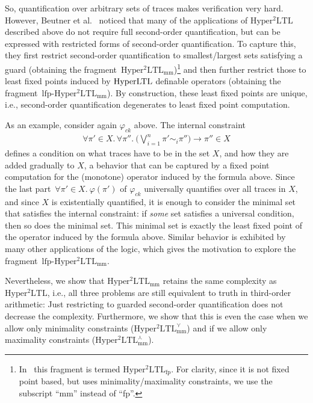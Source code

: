 \documentclass[dvipsnames,10pt,a4paper]{amsart}
\theoremstyle{definition}
\theoremstyle{remark}
\renewcommand{\phi}{\varphi}
\newcommand{\hyltl}{\mathrm{Hyper\-LTL}\xspace}
\newcommand{\sohyltl}{\mathrm{Hyper^2LTL}\xspace}
\newcommand{\sohyltlfp}{\mathrm{Hyper^2LTL_{\mathrm{mm}}}\xspace}
\newcommand{\sohyltlfpmax}{\mathrm{Hyper^2LTL_{\mathrm{mm}}^{\largest}}\xspace}
\newcommand{\sohyltlfpmin}{\mathrm{Hyper^2LTL_{\mathrm{mm}}^{\smallest}}\xspace}
\newcommand{\lfpsohyltlfp}{\mathrm{lfp\text{-}{Hyper^2LTL_{\mathrm{mm}}}}\xspace}
\newcommand{\sohyltlfpold}{\mathrm{Hyper^2LTL_{\mathrm{fp}}}\xspace}
\newcommand{\smallest}{\curlyvee}
\newcommand{\largest}{\curlywedge}
\newcommand{\myquot}[1]{``#1''}
\newcommand{\ck}{\mathit{ck}}
\begin{document}
So, quantification over arbitrary sets of traces makes verification very hard. 
However, Beutner et al.~\cite{DBLP:conf/cav/BeutnerFFM23} noticed that many of the applications of $\sohyltl$ described above do not require full second-order quantification, but can be expressed with restricted forms of second-order quantification.
To capture this, they first restrict second-order quantification to smallest/largest sets satisfying a guard  (obtaining the fragment~$\sohyltlfp$)\footnote{In~\cite{DBLP:conf/cav/BeutnerFFM23} this fragment is termed $\sohyltlfpold$. For clarity, since it is not fixed point based, but uses minimality/maximality constraints, we use the subscript \myquot{mm} instead of \myquot{fp}.} and then further restrict those to least fixed points induced by $\hyltl$ definable operators (obtaining the fragment~$\lfpsohyltlfp$). By construction, these least fixed points are unique, i.e., second-order quantification degenerates to least fixed point computation.

As an example, consider again $ \varphi_\ck $ above. The internal constraint 
\begin{align*}
    \forall \pi' \in X.\, \forall \pi''.\ \big(\bigvee\nolimits_{i=1}^n \pi' \sim_i \pi'' \big) \rightarrow \pi'' \in X 
\end{align*}
defines a condition on what traces have to be in the set $X$, and how they are added gradually to $X$, a behavior that can be captured by a fixed point computation for the (monotone) operator induced by the formula above. Since the last part~$\forall \pi' \in X.\ \varphi({\pi'})$ of $\phi_\ck$ universally quantifies over all traces in $X$, and since $X$ is existentially quantified, it is enough to consider the minimal set that satisfies the internal constraint: if \emph{some} set satisfies a universal condition, then so does the minimal set.
This minimal set is exactly the least fixed point of the operator induced by the formula above.
Similar behavior is exhibited by many other applications of the logic, which gives the motivation to explore the fragment~$\lfpsohyltlfp$.

Nevertheless, we show that $\sohyltlfp$ retains the same complexity as $\sohyltl$, i.e., all three problems are still equivalent to  truth in third-order arithmetic: Just restricting to guarded second-order quantification does not decrease the complexity. Furthermore, we show that this is even the case when we allow only minimality constraints ($\sohyltlfpmin$) and if we allow only maximality constraints ($\sohyltlfpmax$).
\end{document}
